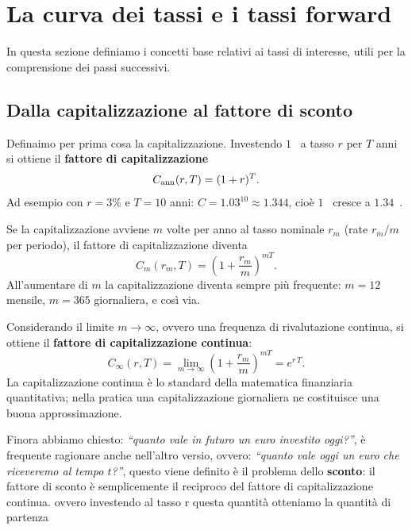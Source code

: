 \documentclass[11pt,a4paper]{article}
\theoremstyle{plain}
\theoremstyle{definition}
\theoremstyle{remark}
\begin{document}
\section{La curva dei tassi e i tassi forward}

In questa sezione definiamo i concetti base relativi ai tassi di interesse, utili per la comprensione dei passi successivi.

\subsection{Dalla capitalizzazione al fattore di sconto}

Definaimo per prima cosa la capitalizzazione.
Investendo $1$~\texteuro{} a tasso $r$ per $T$ anni si ottiene il
\textbf{fattore di capitalizzazione}
\[
  C_{\rm ann}(r,T) = (1+r)^T.
\]
Ad esempio con $r=3\%$ e $T=10$ anni: $C = 1.03^{10} \approx 1.344$, cio\`e $1$~\texteuro{}
cresce a $1.34$~\texteuro{}.

Se la capitalizzazione avviene $m$ volte per anno al tasso nominale $r_m$ (rate $r_m/m$
per periodo), il fattore di capitalizzazione diventa
\[
  C_m(r_m,T) = \left(1 + \frac{r_m}{m}\right)^{mT}.
\]
All'aumentare di $m$ la capitalizzazione diventa sempre pi\`u frequente: $m=12$ mensile,
$m=365$ giornaliera, e cos\`i via.

Considerando il limite ${m\to\infty}$, ovvero una frequenza di rivalutazione continua, si
ottiene il \textbf{fattore di capitalizzazione continua}:
\begin{equation}
  C_\infty(r,T) = \lim_{m\to\infty}\left(1+\frac{r_m}{m}\right)^{mT} = e^{r\,T}.
  \label{eq:cap-cont}
\end{equation}
La capitalizzazione continua \`e lo standard della matematica finanziaria quantitativa; nella
pratica una capitalizzazione giornaliera ne costituisce una buona approssimazione.

Finora abbiamo chiesto: \emph{``quanto vale in futuro un euro investito oggi?''}, è frequente ragionare anche nell'altro versio, ovvero:  \emph{``quanto vale oggi un euro che riceveremo al tempo $t$?''}, questo viene definito \`e il
problema dello \textbf{sconto}: il fattore di sconto \`e semplicemente il reciproco del fattore
di capitalizzazione continua. ovvero investendo al tasso r questa quantità otteniamo la quantità di partenza
\end{document}

